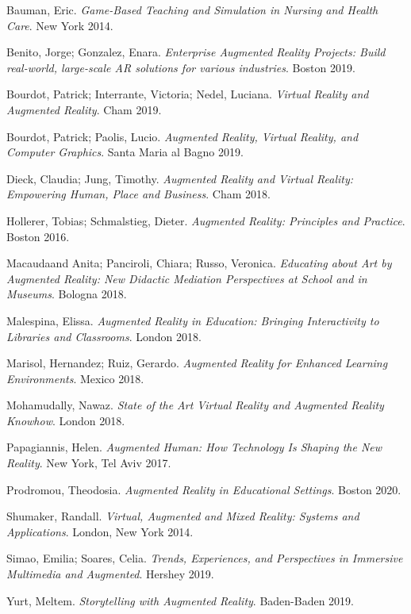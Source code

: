 \documentclass[12pt]{article}
\begin{document}
\begin{thebibliography}{99}

Bauman, Eric.
\textit{Game-Based Teaching and Simulation in Nursing and Health Care}. 
New York 2014.

Benito, Jorge; Gonzalez, Enara.
\textit{Enterprise Augmented Reality Projects: Build real-world, large-scale AR solutions for various industries}. 
Boston 2019.

Bourdot, Patrick; Interrante, Victoria; Nedel, Luciana.
\textit{Virtual Reality and Augmented Reality}. 
Cham 2019.

Bourdot, Patrick; Paolis, Lucio.
\textit{Augmented Reality, Virtual Reality, and Computer Graphics}. 
Santa Maria al Bagno 2019.

Dieck, Claudia; Jung, Timothy.
\textit{Augmented Reality and Virtual Reality: Empowering Human, Place and Business}. 
Cham 2018.

Hollerer, Tobias; Schmalstieg, Dieter.
\textit{Augmented Reality: Principles and Practice}. 
Boston 2016.

Macaudaand Anita; Panciroli, Chiara; Russo, Veronica.
\textit{Educating about Art by Augmented Reality: New Didactic Mediation Perspectives at School and in Museums}. 
Bologna 2018.

Malespina, Elissa.
\textit{Augmented Reality in Education: Bringing Interactivity to Libraries and Classrooms}. 
London 2018.

Marisol, Hernandez; Ruiz, Gerardo.
\textit{Augmented Reality for Enhanced Learning Environments}. 
Mexico 2018.

Mohamudally, Nawaz.
\textit{State of the Art Virtual Reality and Augmented Reality Knowhow}. 
London 2018.

Papagiannis, Helen.
\textit{Augmented Human: How Technology Is Shaping the New Reality}. 
New York, Tel Aviv 2017.

Prodromou, Theodosia.
\textit{Augmented Reality in Educational Settings}. 
Boston 2020.

Shumaker, Randall.
\textit{Virtual, Augmented and Mixed Reality: Systems and Applications}. 
London, New York 2014.

Simao, Emilia; Soares, Celia.
\textit{Trends, Experiences, and Perspectives in Immersive Multimedia and Augmented}. 
Hershey 2019.

Yurt, Meltem.
\textit{Storytelling with Augmented Reality}. 
Baden-Baden 2019.

\end{thebibliography}
\end{document}
